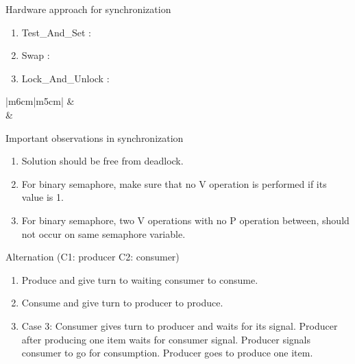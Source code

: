 \begin{enumerate}
 \begin{minipage}{\linewidth}
  \item Hardware approach for synchronization
    \begin{enumerate}
      \item Test\_And\_Set :
      \item Swap :
      \item Lock\_And\_Unlock :
    \end{enumerate}
      \begin{myTableStyle}
        \begin{tabular}{ |m{6cm}|m{5cm}| } \hline
               &
              \\ \hline
               &
              \\ \hline
        \end{tabular}
      \end{myTableStyle}
  \end{minipage}

  \item Important observations in synchronization
    \begin{enumerate}
      \item Solution should be free from deadlock.
      \item For binary semaphore, make sure that no V operation is performed if its value is 1.
      \item For binary semaphore, two V operations with no P operation between, should not occur on same semaphore variable.
    \end{enumerate}

  \begin{minipage}{\linewidth}
  \item Alternation (C1: producer  C2: consumer)
    \begin{enumerate}
      \item Produce and give turn to waiting consumer to consume.
      \item Consume and give turn to producer to produce.
      \item Case 3: Consumer gives turn to producer and waits for its signal. Producer after producing one item waits for
                    consumer signal. Producer signals consumer to go for consumption. Producer goes to produce one item.
    \end{enumerate}
    
  \end{minipage}

\end{enumerate}

